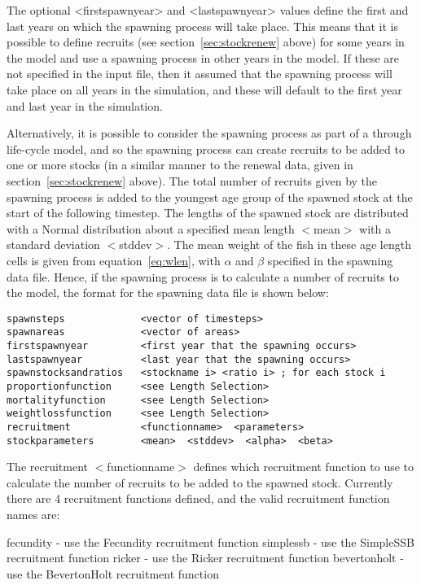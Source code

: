 \documentclass[10pt,twoside]{book}
\begin{document}
The optional <firstspawnyear> and <lastspawnyear> values define the first and last years on which the spawning process will take place.  This means that it is possible to define recruits (see section~\ref{sec:stockrenew} above) for some years in the model and use a spawning process in other years in the model.  If these are not specified in the input file, then it assumed that the spawning process will take place on all years in the simulation, and these will default to the first year and last year in the simulation.

\bigskip
Alternatively, it is possible to consider the spawning process as part of a through life-cycle model, and so the spawning process can create recruits to be added to one or more stocks (in a similar manner to the renewal data, given in section~\ref{sec:stockrenew} above).  The total number of recruits given by the spawning process is added to the youngest age group of the spawned stock at the start of the following timestep.  The lengths of the spawned stock are distributed with a Normal distribution about a specified mean length $<$mean$>$ with a standard deviation $<$stddev$>$.  The mean weight of the fish in these age length cells is given from equation~\ref{eq:wlen}, with $\alpha$ and $\beta$ specified in the spawning data file.  Hence, if the spawning process is to calculate a number of recruits to the model, the format for the spawning data file is shown below:

{\small\begin{verbatim}
spawnsteps             <vector of timesteps>
spawnareas             <vector of areas>
firstspawnyear         <first year that the spawning occurs>
lastspawnyear          <last year that the spawning occurs>
spawnstocksandratios   <stockname i> <ratio i> ; for each stock i
proportionfunction     <see Length Selection>
mortalityfunction      <see Length Selection>
weightlossfunction     <see Length Selection>
recruitment            <functionname>  <parameters>
stockparameters        <mean>  <stddev>  <alpha>  <beta>
\end{verbatim}}

The recruitment $<$functionname$>$ defines which recruitment function to use to calculate the number of recruits to be added to the spawned stock.  Currently there are 4 recruitment functions defined, and the valid recruitment function names are:

\bigskip
fecundity - use the Fecundity recruitment function\newline
simplessb - use the SimpleSSB recruitment function\newline
ricker - use the Ricker recruitment function\newline
bevertonholt - use the BevertonHolt recruitment function
\end{document}
